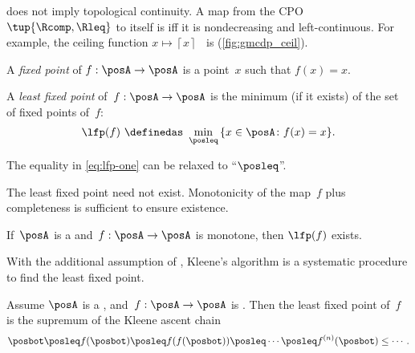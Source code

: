 \begin{remark}
	\scottcontinuity does not imply topological continuity.
	A map from the CPO $\tup{\Rcomp,\Rleq}$ to itself is \scottcontinuous iff it is nondecreasing and left-continuous.
	For example, the ceiling function $x\mapsto\left\lceil x\right\rceil $~ is \scottcontinuous (\cref{fig:gmcdp_ceil}).
\end{remark}


A \emph{fixed point} of $f:\posA\to\posA$ is a point~$x$ such that $f(x)=x$.
\begin{definition}
	\label{def:least-fixed}
	A \emph{least fixed point} of~$f:\posA\to\posA$ is the minimum (if it exists) of the set of fixed points of~$f$:
	\begin{equation}
		\label{eq:lfp-one}
		\lfp(f)\,\,\definedas\,\,\min_{\posleq}\,\{x\in\posA\colon f(x)=x\}.
	\end{equation}

	The equality in \cref{eq:lfp-one} can be relaxed to ``$\posleq$''.
\end{definition}

The least fixed point need not exist.
Monotonicity of the map~$f$ plus completeness is sufficient to ensure existence.

\begin{lemma}
	\label{lem:CPO-fix-point-2}
	If~$\posA$ is a \CPO and~$f:\posA\rightarrow\posA$
	is monotone, then $\lfp(f)$ exists.
\end{lemma}

With the additional assumption of \scottcontinuity, Kleene's algorithm is a systematic procedure to find the least fixed point.

\begin{lemma}
	\label{lem:kleene-1}
	Assume $\posA$ is a \CPO, and~$f:\posA\rightarrow\posA$ is \scottcontinuous.
	Then the least fixed point of~$f$ is the supremum of the Kleene ascent chain
	\begin{equation*}
		\posbot\posleq f(\posbot)\posleq f(f(\posbot))\posleq\cdots\posleq f^{(n)}(\posbot)\leq\cdots.
	\end{equation*}
\end{lemma}

